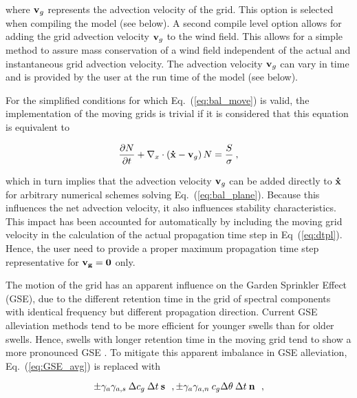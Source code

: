 \noindent
where ${\bf{v}}_g$ represents the advection velocity of the grid. This option
is selected when compiling the model (see below). A second compile level
option allows for adding the grid advection velocity ${\bf{v}}_g$ to the wind
field. This allows for a simple method to assure mass conservation of a wind
field independent of the actual and instantaneous grid advection velocity. The
advection velocity ${\bf{v}}_g$ can vary in time and is provided by the user
at the run time of the model (see below).

\vspace{\baselineskip} 
\vspace{\baselineskip} 

\noindent
For the simplified conditions for which Eq.~(\ref{eq:bal_move}) is valid, the
implementation of the moving grids is trivial if it is considered that this
equation is equivalent to

\begin{equation}
\frac{\partial N}{\partial t} + 
\nabla_x \cdot \left ( {\bf\dot{x}}-{\bf{v}}_g \right ) N  = 
\frac{S}{\sigma} \: , \label{eq:bal_move2}
\end{equation}

\noindent
which in turn implies that the advection velocity ${\bf{v}}_g$ can be added
directly to ${\bf\dot{x}}$ for arbitrary numerical schemes solving
Eq.~(\ref{eq:bal_plane}). Because this influences the net advection velocity,
it also influences stability characteristics. This impact has been accounted
for automatically by including the moving grid velocity in the calculation of
the actual propagation time step in Eq~(\ref{eq:dtpl}). Hence, the user need
to provide a proper maximum propagation time step representative for $\bf{v}_g
= 0$ only.

The motion of the grid has an apparent influence on the Garden Sprinkler
Effect (GSE), due to the different retention time in the grid of spectral
components with identical frequency but different propagation direction.
Current GSE alleviation methods tend to be more efficient for younger swells
than for older swells. Hence, swells with longer retention time in the moving
grid tend to show a more pronounced GSE \citep[see][]{tol:OMOD05b}. To
mitigate this apparent imbalance in GSE alleviation,  Eq.~(\ref{eq:GSE_avg}) is
replaced with

\begin{equation}
\pm \gamma_a \gamma_{a,s} \: \Delta c_g \: \Delta t \: \mbox{\bf s} \:\:\: ,
\pm \gamma_a \gamma_{a,n} \: c_g \Delta \theta \: \Delta t \: \mbox{\bf n} \:\:\: ,
\label{eq:move_GSE_avg1}
\end{equation}

